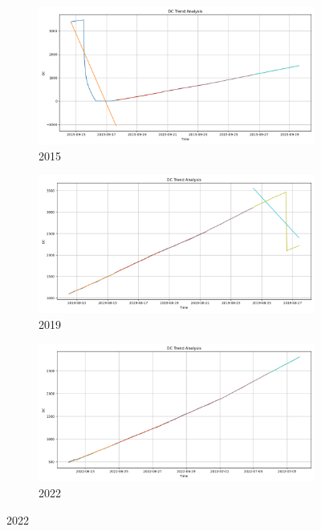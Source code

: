 \begin{figure}[h]
	\centering
	\caption{All-time DC polyfit trend}
	\begin{subfigure}{0.3\textwidth}
		\centering
		\includegraphics[width=\textwidth]{graphs/polyfit_trend_analysis/2015_15days_BLOCK3days_dc_trend_analysis.png}
		\caption{2015}
		\label{fig:2015_polyfit_DC_alltime}
	\end{subfigure}
	\hfill
	\begin{subfigure}{0.3\textwidth}
		\centering
		\includegraphics[width=\textwidth]{graphs/polyfit_trend_analysis/2019_15days_BLOCK3days_dc_trend_analysis.png}
		\caption{2019}
		\label{fig:2019_polyfit_DC_alltime}
	\end{subfigure}
	\hfill
	\begin{subfigure}{0.3\textwidth}
		\centering
		\includegraphics[width=\textwidth]{graphs/polyfit_trend_analysis/2022_15days_BLOCK3days_dc_trend_analysis.png}
		\caption{2022}
		\label{fig:2022_polyfit_DC_alltime}
	\end{subfigure}
	
	\label{fig:DC_polyfit_alltime}
\end{figure}

